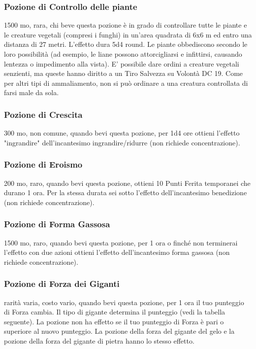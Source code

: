 \begin{multicols}{2}
	\subsubsection*{Pozione di Controllo delle piante}
	1500 mo, rara, chi beve questa pozione è in grado di controllare tutte le piante e le creature vegetali (compresi i funghi) in un’area quadrata di 6x6 m ed entro una distanza di 27 metri. L'effetto dura 5d4 round. Le piante obbediscono secondo le loro possibilità (ad esempio, le liane possono attorcigliarsi e infittirsi, causando lentezza o impedimento alla vista). E' possibile dare ordini a creature vegetali senzienti, ma queste hanno diritto a un Tiro Salvezza su Volontà DC 19. Come per altri tipi di ammaliamento, non si può ordinare a una creatura controllata di farsi male da sola.

	\subsubsection*{Pozione di Crescita}
	300 mo, non comune, quando bevi questa pozione, per 1d4 ore ottieni l'effetto "ingrandire" dell'incantesimo ingrandire/ridurre (non richiede concentrazione).

	\subsubsection*{Pozione di Eroismo}
	200 mo, raro, quando bevi questa pozione, ottieni 10 Punti Ferita temporanei che durano 1 ora. Per la stessa durata sei sotto l'effetto dell'incantesimo benedizione (non richiede concentrazione).

	\subsubsection*{Pozione di Forma Gassosa}

	1500 mo, raro, quando bevi questa pozione, per 1 ora o finché non terminerai l'effetto con due azioni ottieni l'effetto dell'incantesimo forma gassosa (non richiede concentrazione).

	\subsubsection*{Pozione di Forza dei Giganti}
	rarità varia, costo vario, quando bevi questa pozione, per 1 ora il tuo punteggio di Forza cambia. Il tipo di gigante determina il punteggio (vedi la tabella seguente). La pozione non ha effetto se il tuo punteggio di Forza è pari o superiore al nuovo punteggio. La pozione della forza del gigante del gelo e la pozione della forza del gigante di pietra hanno lo stesso effetto.


\end{multicols}
